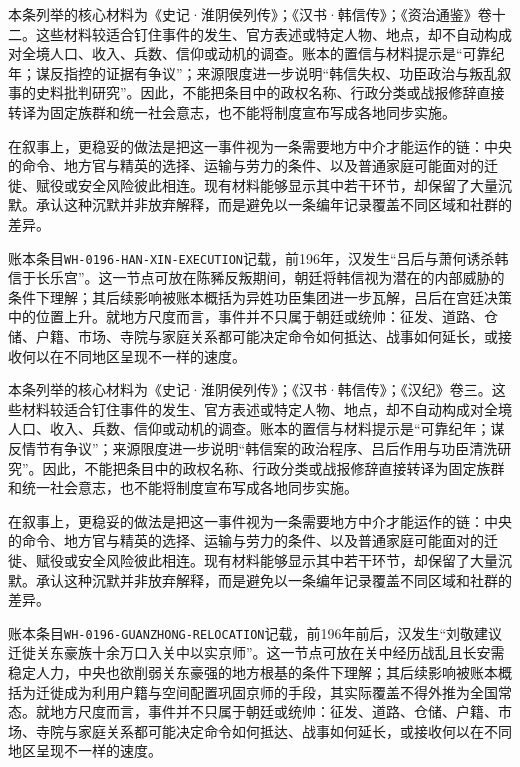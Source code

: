 本条列举的核心材料为《史记·淮阴侯列传》；《汉书·韩信传》；《资治通鉴》卷十二。这些材料较适合钉住事件的发生、官方表述或特定人物、地点，却不自动构成对全境人口、收入、兵数、信仰或动机的调查。账本的置信与材料提示是“可靠纪年；谋反指控的证据有争议”；来源限度进一步说明“韩信失权、功臣政治与叛乱叙事的史料批判研究”。因此，不能把条目中的政权名称、行政分类或战报修辞直接转译为固定族群和统一社会意志，也不能将制度宣布写成各地同步实施。

在叙事上，更稳妥的做法是把这一事件视为一条需要地方中介才能运作的链：中央的命令、地方官与精英的选择、运输与劳力的条件、以及普通家庭可能面对的迁徙、赋役或安全风险彼此相连。现有材料能够显示其中若干环节，却保留了大量沉默。承认这种沉默并非放弃解释，而是避免以一条编年记录覆盖不同区域和社群的差异。

账本条目\texttt{WH-0196-HAN-XIN-EXECUTION}记载，前196年，汉发生“吕后与萧何诱杀韩信于长乐宫”。这一节点可放在陈豨反叛期间，朝廷将韩信视为潜在的内部威胁的条件下理解；其后续影响被账本概括为异姓功臣集团进一步瓦解，吕后在宫廷决策中的位置上升。就地方尺度而言，事件并不只属于朝廷或统帅：征发、道路、仓储、户籍、市场、寺院与家庭关系都可能决定命令如何抵达、战事如何延长，或接收何以在不同地区呈现不一样的速度。

本条列举的核心材料为《史记·淮阴侯列传》；《汉书·韩信传》；《汉纪》卷三。这些材料较适合钉住事件的发生、官方表述或特定人物、地点，却不自动构成对全境人口、收入、兵数、信仰或动机的调查。账本的置信与材料提示是“可靠纪年；谋反情节有争议”；来源限度进一步说明“韩信案的政治程序、吕后作用与功臣清洗研究”。因此，不能把条目中的政权名称、行政分类或战报修辞直接转译为固定族群和统一社会意志，也不能将制度宣布写成各地同步实施。

在叙事上，更稳妥的做法是把这一事件视为一条需要地方中介才能运作的链：中央的命令、地方官与精英的选择、运输与劳力的条件、以及普通家庭可能面对的迁徙、赋役或安全风险彼此相连。现有材料能够显示其中若干环节，却保留了大量沉默。承认这种沉默并非放弃解释，而是避免以一条编年记录覆盖不同区域和社群的差异。

账本条目\texttt{WH-0196-GUANZHONG-RELOCATION}记载，前196年前后，汉发生“刘敬建议迁徙关东豪族十余万口入关中以实京师”。这一节点可放在关中经历战乱且长安需稳定人力，中央也欲削弱关东豪强的地方根基的条件下理解；其后续影响被账本概括为迁徙成为利用户籍与空间配置巩固京师的手段，其实际覆盖不得外推为全国常态。就地方尺度而言，事件并不只属于朝廷或统帅：征发、道路、仓储、户籍、市场、寺院与家庭关系都可能决定命令如何抵达、战事如何延长，或接收何以在不同地区呈现不一样的速度。

